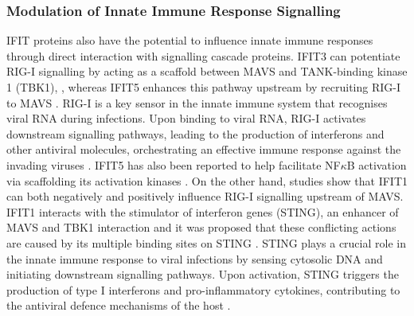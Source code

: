 \subsubsection{Modulation of Innate Immune Response Signalling} \label{Modulation of Innate Immune Response Signalling}
IFIT proteins also have the potential to influence innate immune responses through direct interaction with signalling cascade proteins. IFIT3 can potentiate RIG-I signalling by acting as a scaffold between MAVS and TANK-binding kinase 1 (TBK1), \cite{Liu2011IFN-InducedTBK1}, whereas IFIT5 enhances this pathway upstream by recruiting RIG-I to MAVS \cite{Zhang2013IFIT5Pathways}. RIG-I is a key sensor in the innate immune system that recognises viral RNA during infections. Upon binding to viral RNA, RIG-I activates downstream signalling pathways, leading to the production of interferons and other antiviral molecules, orchestrating an effective immune response against the invading viruses \cite{Thoresen2021TheSignaling}. IFIT5 has also been reported to help facilitate NF\(\kappa\)B activation via scaffolding its activation kinases \cite{Zhang2013IFIT5Pathways}. On the other hand, studies show that IFIT1 can both negatively and positively influence RIG-I signalling upstream of MAVS. IFIT1 interacts with the stimulator of interferon genes (STING), an enhancer of MAVS and TBK1 interaction and it was proposed that these conflicting actions are caused by its multiple binding sites on STING \cite{Li2009ISG56Response, Reynaud2015IFIT1Interferon}. STING plays a crucial role in the innate immune response to viral infections by sensing cytosolic DNA and initiating downstream signalling pathways. Upon activation, STING triggers the production of type I interferons and pro-inflammatory cytokines, contributing to the antiviral defence mechanisms of the host \cite{Barber2015STING:Cancer}.

